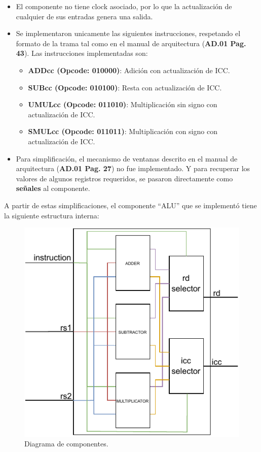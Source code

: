 \documentclass[
  11pt, %
  codirector, %
]{charter}
\begin{document}
\begin{itemize}
\item El componente no tiene clock asociado, por lo que la actualización de
  cualquier de sus entradas genera una salida.
\item Se implementaron unicamente las siguientes instrucciones, respetando el
  formato de la trama tal como en el manual de arquitectura
  (\textbf{AD.01 Pag. 43}). Las instrucciones implementadas son:
  \begin{itemize}
  \item \textbf{ADDcc (Opcode: 010000)}: Adición con actualización de ICC.
  \item \textbf{SUBcc (Opcode: 010100)}: Resta con actualización de ICC.
  \item \textbf{UMULcc (Opcode: 011010)}: Multiplicación sin signo con actualización de ICC.
  \item \textbf{SMULcc (Opcode: 011011)}: Multiplicación con signo con actualización de ICC.
  \end{itemize}
\item Para simplificación, el mecanismo de ventanas descrito en el manual de
  arquitectura (\textbf{AD.01 Pag. 27}) no fue implementado. Y para recuperar
  los valores de algunos registros requeridos, se pasaron directamente como
  \textbf{señales} al componente.
\end{itemize}

A partir de estas simplificaciones, el componente ``ALU'' que se implementó
tiene la siguiente estructura interna:

\newpage

\begin{figure}[htpb]
  \centering
  \includegraphics[width=.5\textwidth]{./Figuras/Components.pdf}
  \caption{Diagrama de componentes.}
  \label{fig:Components}
\end{figure}
\end{document}
